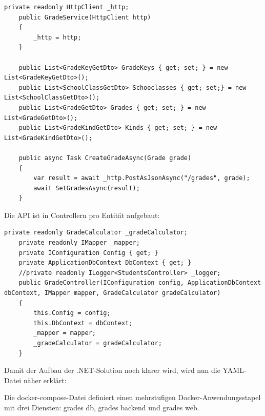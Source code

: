 \begin{lstlisting}[language={[Sharp]C}, caption=Services für Kommunikation, label=lst:imp:service]
    private readonly HttpClient _http;
    public GradeService(HttpClient http)
    {
        _http = http;
    }

    public List<GradeKeyGetDto> GradeKeys { get; set; } = new List<GradeKeyGetDto>();
    public List<SchoolClassGetDto> Schooclasses { get; set;} = new List<SchoolClassGetDto>();
    public List<GradeGetDto> Grades { get; set; } = new List<GradeGetDto>();
    public List<GradeKindGetDto> Kinds { get; set; } = new List<GradeKindGetDto>();
    
    public async Task CreateGradeAsync(Grade grade)
    {
        var result = await _http.PostAsJsonAsync("/grades", grade);
        await SetGradesAsync(result);
    }
\end{lstlisting}

\newpage

Die API ist in Controllern pro Entität aufgebaut:
\begin{lstlisting}[language={[Sharp]C}, caption=API - Controller, label=lst:imp:controller]
    private readonly GradeCalculator _gradeCalculator;
    private readonly IMapper _mapper;
    private IConfiguration Config { get; }
    private ApplicationDbContext DbContext { get; }
    //private readonly ILogger<StudentsController> _logger;
    public GradeController(IConfiguration config, ApplicationDbContext dbContext, IMapper mapper, GradeCalculator gradeCalculator) 
    {
        this.Config = config;
        this.DbContext = dbContext;
        _mapper = mapper;
        _gradeCalculator = gradeCalculator;       
    }
\end{lstlisting}

\newpage
Damit der Aufbau der .NET-Solution noch klarer wird, wird nun die YAML-Datei näher erklärt:

Die docker-compose-Datei definiert einen mehrstufigen Docker-Anwendungsstapel mit drei Diensten: 
grades \textunderscore db, grades \textunderscore backend und grades \textunderscore web.

